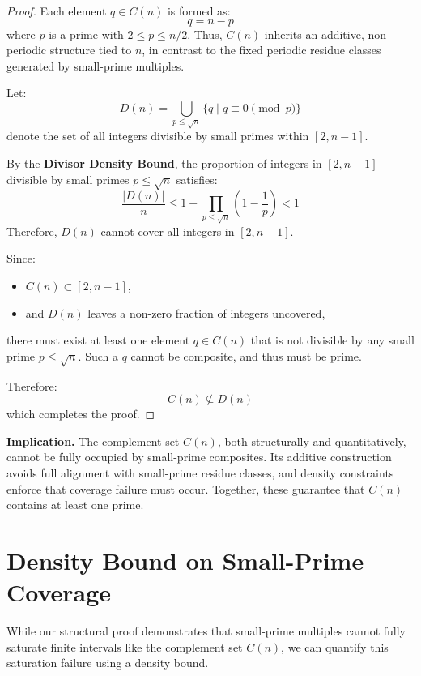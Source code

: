 \documentclass[11pt]{article}
\begin{document}
	\begin{proof}
		Each element \( q \in C(n) \) is formed as:
		\[
		q = n - p
		\]
		where \( p \) is a prime with \( 2 \leq p \leq n/2 \). Thus, \( C(n) \) inherits an additive, non-periodic structure tied to \( n \), in contrast to the fixed periodic residue classes generated by small-prime multiples.
		
		Let:
		\[
		D(n) = \bigcup_{p \leq \sqrt{n}} \{ q \mid q \equiv 0 \pmod{p} \}
		\]
		denote the set of all integers divisible by small primes within \([2, n-1]\).
		
		By the \textbf{Divisor Density Bound}, the proportion of integers in \([2, n-1]\) divisible by small primes \( p \leq \sqrt{n} \) satisfies:
		\[
		\frac{|D(n)|}{n} \leq 1 - \prod_{p \leq \sqrt{n}} \left(1 - \frac{1}{p}\right) < 1
		\]
		Therefore, \( D(n) \) cannot cover all integers in \([2, n-1]\).
		
		Since:
		\begin{itemize}
			\item \( C(n) \subset [2, n-1] \),
			\item and \( D(n) \) leaves a non-zero fraction of integers uncovered,
		\end{itemize}
		there must exist at least one element \( q \in C(n) \) that is not divisible by any small prime \( p \leq \sqrt{n} \). Such a \( q \) cannot be composite, and thus must be prime.
		
		Therefore:
		\[
		C(n) \not\subseteq D(n)
		\]
		which completes the proof.
	\end{proof}
	
	\textbf{Implication.}  
	The complement set \( C(n) \), both structurally and quantitatively, cannot be fully occupied by small-prime composites. Its additive construction avoids full alignment with small-prime residue classes, and density constraints enforce that coverage failure must occur. Together, these guarantee that \( C(n) \) contains at least one prime.

	
	
	
	\section{Density Bound on Small-Prime Coverage}
	
	While our structural proof demonstrates that small-prime multiples cannot fully saturate finite intervals like the complement set \( C(n) \), we can quantify this saturation failure using a density bound.
	
\end{document}
